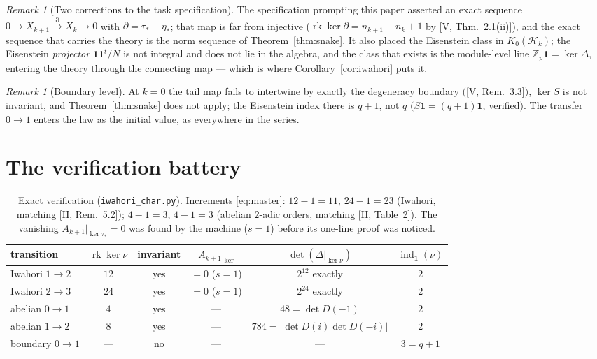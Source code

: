 \documentclass[11pt]{amsart}
\numberwithin{equation}{section}
\theoremstyle{definition}
\theoremstyle{remark}
\newtheorem{remark}[theorem]{Remark}
\newcommand{\Z}{\mathbb{Z}}
\newcommand{\Zp}{\Z_p}
\newcommand{\rk}{\operatorname{rk}}
\newcommand{\ind}{\operatorname{ind}_{\mathbf1}}
\newcommand{\ta}{\tau_*}
\newcommand{\et}{\eta_*}
\begin{document}
\begin{remark}[Two corrections to the task specification]\label{rem:corrections}
The specification prompting this paper asserted an exact sequence
$0\to X_{k+1}\xrightarrow{\partial}X_k\to0$ with $\partial=\ta-\et$; that map is far
from injective ($\rk\ker\partial=n_{k+1}-n_k+1$ by {\rm[V, Thm.~2.1(ii)]}), and the
exact sequence that carries the theory is the norm sequence of
Theorem~\ref{thm:snake}. It also placed the Eisenstein class in
$K_0(\mathcal H_k)$; the Eisenstein \emph{projector} $\mathbf1\mathbf1^{t}/N$ is not
integral and does not lie in the algebra, and the class that exists is the
module-level line $\Zp\mathbf1=\ker\Delta$, entering the theory through the
connecting map --- which is where Corollary~\ref{cor:iwahori} puts it.
\end{remark}

\begin{remark}[Boundary level]\label{rem:boundary}
At $k=0$ the tail map fails to intertwine by exactly the degeneracy boundary
$($[V, Rem.~3.3]$)$, $\ker S$ is not invariant, and Theorem~\ref{thm:snake} does not
apply; the Eisenstein index there is $q+1$, not $q$
$(S\mathbf1=(q+1)\mathbf1$, verified$)$. The transfer $0\to1$ enters the law as the
initial value, as everywhere in the series.
\end{remark}

\section{The verification battery}\label{sec:battery}

\begin{table}[ht]
\centering\small
\renewcommand{\arraystretch}{1.2}
\begin{tabular}{lccccc}
\toprule
transition & $\rk\ker\nu$ & invariant & $A_{k+1}|_{\ker}$ &
$\det(\Delta|_{\ker\nu})$ & $\ind(\nu)$\\
\midrule
Iwahori $1\to2$ & $12$ & yes & $=0$ ($s{=}1$) & $2^{12}$ exactly & $2$\\
Iwahori $2\to3$ & $24$ & yes & $=0$ ($s{=}1$) & $2^{24}$ exactly & $2$\\
abelian $0\to1$ & $4$ & yes & --- & $48=\det D(-1)$ & $2$\\
abelian $1\to2$ & $8$ & yes & --- & $784=|\det D(i)\det D(-i)|$ & $2$\\
boundary $0\to1$ & --- & no & --- & --- & $3=q+1$\\
\bottomrule
\end{tabular}
\medskip
\caption{Exact verification (\texttt{iwahori\_char.py}). Increments
\eqref{eq:master}: $12-1=11$, $24-1=23$ (Iwahori, matching [II, Rem.~5.2]);
$4-1=3$, $4-1=3$ (abelian $2$-adic orders, matching [II, Table~2]). The vanishing
$A_{k+1}|_{\ker\ta}=0$ was found by the machine ($s=1$) before its one-line proof
was noticed.}
\label{tab:battery}
\end{table}
\end{document}
